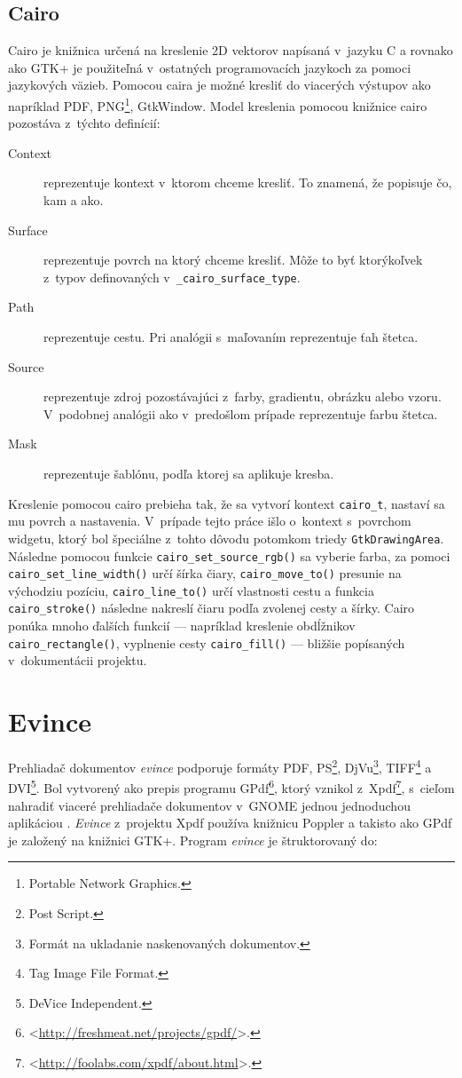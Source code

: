 \documentclass[12pt,oneside,final]{fithesis2}
\begin{document}
\section{Cairo}
Cairo je knižnica určená na kreslenie 2D vektorov napísaná v~jazyku C a rovnako ako GTK+ je použiteľná v~ostatných programovacích jazykoch za pomoci jazykových väzieb. Pomocou caira je možné kresliť do viacerých výstupov ako napríklad PDF, PNG\footnote{Portable Network Graphics.}, GtkWindow. Model kreslenia pomocou knižnice cairo pozostáva z~týchto definícií:
\begin{description}
\item[Context] reprezentuje kontext v~ktorom chceme kresliť. To znamená, že popisuje čo, kam a ako.
\item[Surface] reprezentuje povrch na ktorý chceme kresliť. Môže to byť ktorýkoľvek z~typov definovaných v~\texttt{\_cairo\_surface\_type}.
\item[Path] reprezentuje cestu. Pri analógii s~maľovaním reprezentuje ťah štetca.
\item[Source] reprezentuje zdroj pozostávajúci z~farby, gradientu, obrázku alebo vzoru. V~podobnej analógii ako v~predošlom prípade reprezentuje farbu štetca.
\item[Mask] reprezentuje šablónu, podľa ktorej sa aplikuje kresba.
\end{description}
Kreslenie pomocou cairo prebieha tak, že sa vytvorí kontext \texttt{cairo\_t}, nastaví sa mu povrch a nastavenia. V~prípade tejto práce išlo o~kontext s~povrchom widgetu, ktorý bol špeciálne z~tohto dôvodu potomkom triedy \texttt{GtkDrawingArea}. Následne pomocou funkcie \texttt{cairo\_set\_source\_rgb()} sa vyberie farba, za pomoci \texttt{cairo\_set\_line\_width()} určí šírka čiary, \texttt{cairo\_move\_to()} presunie na východziu pozíciu, \texttt{cairo\_line\_to()} určí vlastnosti cestu a funkcia \texttt{cairo\_stroke()} následne nakreslí čiaru podľa zvolenej cesty a šírky. Cairo ponúka mnoho ďalších funkcií --- napríklad kreslenie obdĺžnikov \texttt{cairo\_rectangle()}, vyplnenie cesty \texttt{cairo\_fill()} --- bližšie popísaných v~dokumentácii projektu\cite{cairodoc}.
\chapter{Evince}
Prehliadač dokumentov \emph{evince} podporuje formáty PDF, PS\footnote{Post Script.}, DjVu\footnote{Formát na ukladanie naskenovaných dokumentov.}, TIFF\footnote{Tag Image File Format.} a DVI\footnote{DeVice Independent.}. Bol vytvorený ako prepis programu GPdf\footnote{<\url{http://freshmeat.net/projects/gpdf/}>.}, ktorý vznikol z~Xpdf\footnote{<\url{http://foolabs.com/xpdf/about.html}>.}, s~cieľom nahradiť viaceré prehliadače dokumentov v~GNOME jednou jednoduchou aplikáciou \cite{evince}. \emph{Evince} z~projektu Xpdf používa knižnicu Poppler a takisto ako GPdf je založený na knižnici GTK+. Program \emph{evince} je štruktorovaný do:
\end{document}
